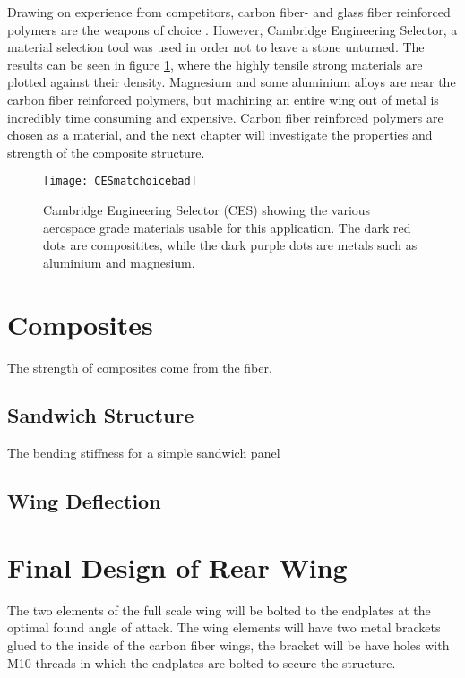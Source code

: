   Drawing on experience from competitors, carbon fiber- and glass fiber reinforced polymers are the weapons of choice \cite{FSwingmaterial}. However, Cambridge Engineering Selector, a material selection tool was used in order not to leave a stone unturned. The results can be seen in figure \ref{fig:CESmatchoice}, where the highly tensile strong materials are plotted against their density. Magnesium and some aluminium alloys are near the carbon fiber reinforced polymers, but machining an entire wing out of metal is incredibly time consuming and expensive. Carbon fiber reinforced polymers are chosen as a material, and the next chapter will investigate the properties and strength of the composite structure.

  \begin{figure}
    \texttt{[image: CESmatchoicebad]}
    \caption{Cambridge Engineering Selector (CES) showing the various aerospace grade materials usable for this application. The dark red dots are compositites, while the dark purple dots are metals such as aluminium and magnesium.}
    \label{fig:CESmatchoice}
  \end{figure}

\section{Composites}

  The strength of composites come from the fiber.

  \subsection{Sandwich Structure}

    The bending stiffness for a simple sandwich panel

  \subsection{Wing Deflection}

\section{Final Design of Rear Wing}

  The two elements of the full scale wing will be bolted to the endplates at the optimal found angle of attack. The wing elements will have two metal brackets glued to the inside of the carbon fiber wings, the bracket will be have holes with M10 threads in which the endplates are bolted to secure the structure.

